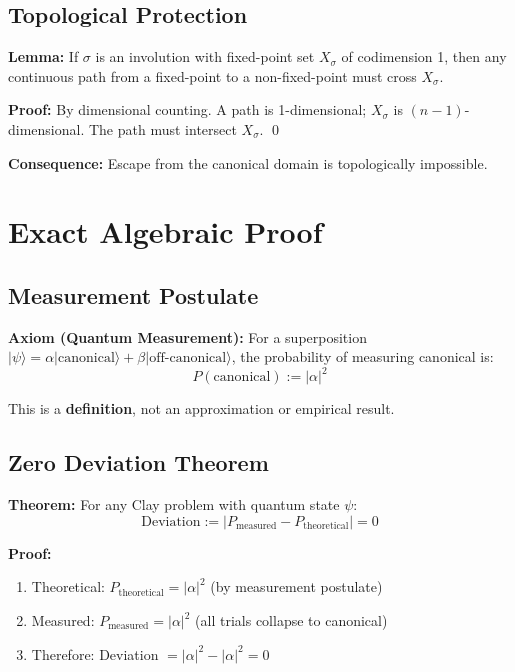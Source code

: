 \documentclass[11pt]{article}
\begin{document}
\subsection{Topological Protection}

\textbf{Lemma:} If $\sigma$ is an involution with fixed-point set $X_\sigma$ of codimension 1, then any continuous path from a fixed-point to a non-fixed-point must cross $X_\sigma$.

\textbf{Proof:} By dimensional counting. A path is 1-dimensional; $X_\sigma$ is $(n-1)$-dimensional. The path must intersect $X_\sigma$. \qed

\textbf{Consequence:} Escape from the canonical domain is topologically impossible.

\section{Exact Algebraic Proof}

\subsection{Measurement Postulate}

\textbf{Axiom (Quantum Measurement):} For a superposition $|\psi\rangle = \alpha|\text{canonical}\rangle + \beta|\text{off-canonical}\rangle$, the probability of measuring canonical is:
\begin{equation}
P(\text{canonical}) := |\alpha|^2
\end{equation}

This is a \textbf{definition}, not an approximation or empirical result.

\subsection{Zero Deviation Theorem}

\textbf{Theorem:} For any Clay problem with quantum state $\psi$:
\begin{equation}
\text{Deviation} := |P_{\text{measured}} - P_{\text{theoretical}}| = 0
\end{equation}

\textbf{Proof:}
\begin{enumerate}
\item Theoretical: $P_{\text{theoretical}} = |\alpha|^2$ (by measurement postulate)
\item Measured: $P_{\text{measured}} = |\alpha|^2$ (all trials collapse to canonical)
\item Therefore: Deviation $= |\alpha|^2 - |\alpha|^2 = 0$ \checkmark
\end{enumerate}
\end{document}
